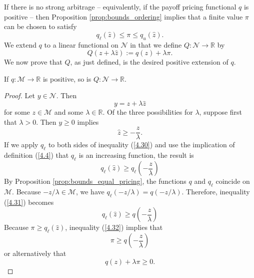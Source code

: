 \documentclass[\topdir/lecture\_notes.tex]{subfiles}
\begin{document}
\begin{optional}
If there is no strong arbitrage -- equivalently, if the payoff pricing functional \(q\) is positive -- then Proposition \ref{prop:bounds_ordering} implies that a finite value \(\pi\) can be chosen to satisfy
\begin{equation*}
q_{\ell}(\hat{z}) \leq \pi \leq q_{u}(\hat{z}) . 
\end{equation*}
We extend \(q\) to a linear functional on \(\mathcal{N}\) in that we define \(Q: \mathcal{N} \rightarrow \mathbb{R}\) by
\begin{equation}
Q(z+\lambda \hat{z}) := q(z)+\lambda \pi . \label{4.28}
\end{equation}
We now prove that \(Q\), as just defined, is the desired positive extension of \(q\).

\begin{proposition} \label{prop:extension_positive}
If \(q: \mathcal{M} \rightarrow \mathbb{R}\) is positive, so is \(Q: \mathcal{N} \rightarrow \mathbb{R}\).
\end{proposition}
\begin{proof}
Let \(y \in \mathcal{N}\). Then
\begin{equation*}
y=z+\lambda \hat{z} 
\end{equation*}
for some \(z \in \mathcal{M}\) and some \(\lambda \in \mathbb{R}\). Of the three possibilities for \(\lambda\), suppose first that \(\lambda>0\). Then \(y \geq 0\) implies
\begin{equation}
\hat{z} \geq-\frac{z}{\lambda} . \label{4.30}
\end{equation}
If we apply \(q_{\ell}\) to both sides of inequality (\ref{4.30}) and use the implication of definition (\ref{4.4}) that \(q_{\ell}\) is an increasing function, the result is
\begin{equation}
q_{\ell}(\hat{z}) \geq q_{\ell}\left(-\frac{z}{\lambda}\right) \label{4.31}
\end{equation}
By Proposition \ref{prop:bounds_equal_pricing}, the functions \(q\) and \(q_{\ell}\) coincide on \(\mathcal{M}\). Because \(-z / \lambda \in \mathcal{M}\), we have \(q_{\ell}(-z / \lambda)=q(-z / \lambda)\). Therefore, inequality (\ref{4.31}) becomes
\begin{equation}
q_{\ell}(\hat{z}) \geq q\left(-\frac{z}{\lambda}\right) \label{4.32}
\end{equation}
Because \(\pi \geq q_{\ell}(\hat{z})\), inequality (\ref{4.32}) implies that
\begin{equation*}
\pi \geq q\left(-\frac{z}{\lambda}\right) 
\end{equation*}
or alternatively that
\begin{equation}
q(z)+\lambda \pi \geq 0 . \label{4.34}
\end{equation}


\end{proof}
\end{optional}
\end{document}
